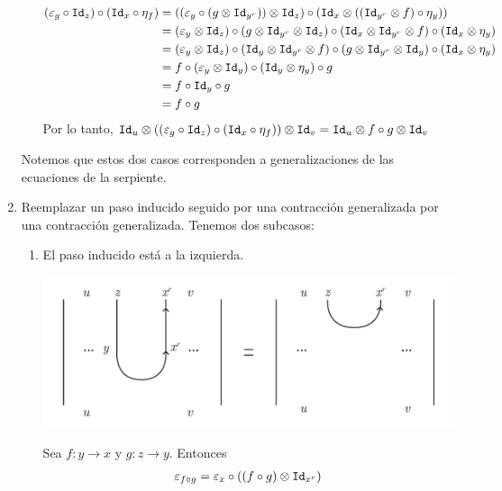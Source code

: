 \documentclass[../main.tex]{subfiles}
\begin{document}
\begin{enumerate}
\begin{enumerate}
                \begin{align*}
                    (\varepsilon_g \circ \texttt{Id}_z) \circ (\texttt{Id}_x \circ \eta_f) &= ((\varepsilon_y \circ (g \otimes \texttt{Id}_{y^r}))\otimes \texttt{Id}_{z}) \circ (\texttt{Id}_x \otimes ((\texttt{Id}_{y^r} \otimes f) \circ \eta_y)) \\
                    &= (\varepsilon_y \otimes \texttt{Id}_z) \circ (g \otimes \texttt{Id}_{y^r} \otimes \texttt{Id}_z) \circ (\texttt{Id}_x \otimes \texttt{Id}_{y^r} \otimes f) \circ (\texttt{Id}_x \otimes \eta_y) \\
                    &= (\varepsilon_y \otimes \texttt{Id}_z) \circ (\texttt{Id}_y \otimes \texttt{Id}_{y^r} \otimes f) \circ (g \otimes \texttt{Id}_{y^r} \otimes \texttt{Id}_y) \circ (\texttt{Id}_x \otimes \eta_y) \\
                    &= f \circ (\varepsilon_y \otimes \texttt{Id}_y) \circ (\texttt{Id}_y \otimes \eta_y) \circ g \\
                    &= f \circ \texttt{Id}_y \circ g \\
                    &= f \circ g
                \end{align*}
                Por lo tanto, $\texttt{Id}_u \otimes ((\varepsilon_g \circ \texttt{Id}_z) \circ (\texttt{Id}_x \circ \eta_f)) \otimes \texttt{Id}_v = \texttt{Id}_u \otimes f \circ g \otimes \texttt{Id}_v$
            \end{enumerate}
        Notemos que estos dos casos corresponden a generalizaciones de las ecuaciones de la serpiente.  
        \item Reemplazar un paso inducido seguido por una contracción generalizada por una contracción generalizada. Tenemos dos subcasos:
        \begin{enumerate}
            \item El paso inducido está a la izquierda. 
            \begin{center} \includegraphics[scale=.2]{TeX/diagrama/5-10.pdf}
                \end{center}
            Sea $f: y \to x$ y $g:z \to y$. Entonces
            \begin{align*}
                \varepsilon_{f \circ g} &= \varepsilon_x \circ ((f\circ g) \otimes \id_{x^r})  \\

\end{align*}
\end{enumerate}
\end{enumerate}
\end{document}
